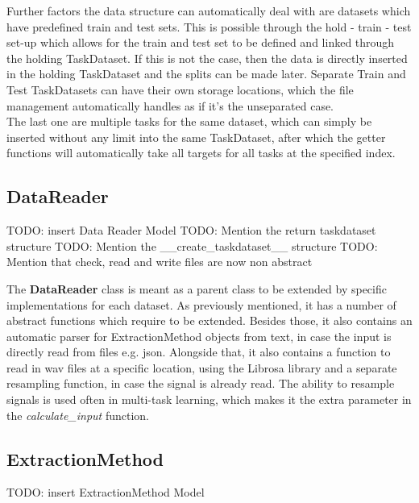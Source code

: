 Further factors the data structure can automatically deal with are datasets which have predefined train and test sets. This is possible through the hold - train - test set-up which allows for the train and test set to be defined and linked through the holding TaskDataset. If this is not the case, then the data is directly inserted in the holding TaskDataset and the splits can be made later. Separate Train and Test TaskDatasets can have their own storage locations, which the file management automatically handles as if it's the unseparated case.\\

The last one are multiple tasks for the same dataset, which can simply be inserted without any limit into the same TaskDataset, after which the getter functions will automatically take all targets for all tasks at the specified index. \\

\subsection{DataReader} \label{Impl:DataRead:DataReader}

TODO: insert Data Reader Model
TODO: Mention the return taskdataset structure
TODO: Mention the __create_taskdataset__ structure
TODO: Mention that check, read and write files are now non abstract

The \textbf{DataReader} class is meant as a parent class to be extended by specific implementations for each dataset. As previously mentioned, it has a number of abstract functions which require to be extended. Besides those, it also contains an automatic parser for ExtractionMethod objects from text, in case the input is directly read from files e.g. json. Alongside that, it also contains a function to read in wav files at a specific location, using the Librosa library and a separate resampling function, in case the signal is already read. The ability to resample signals is used often in multi-task learning, which makes it the extra parameter in the \textit{calculate\_input} function.

\subsection{ExtractionMethod} \label{Impl:DataRead:ExtractionMethod}

TODO: insert ExtractionMethod Model

